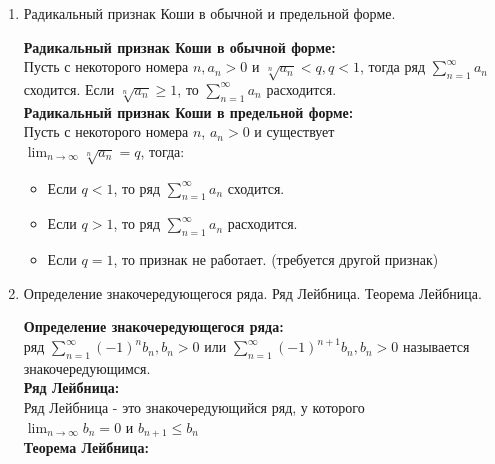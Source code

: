 \documentclass[a4paper, 12pt]{article}
\begin{document}
\begin{enumerate}
\begin{mdframed}
\begin{itemize}
			      \item Если $q < 1$, то ряд $\sum_{n=1}^{\infty} a_n$ сходится.
			      \item Если $q > 1$, то ряд $\sum_{n=1}^{\infty} a_n$ расходится.
			      \item Если $q = 1$, то признак не работает. (требуется другой признак)
		      \end{itemize}
	      \end{mdframed}
	\item Радикальный признак Коши в обычной и предельной форме. \\
	      \begin{mdframed}
		      \textbf{Радикальный признак Коши в обычной форме:} \\
		      Пусть с некоторого номера $n, a_n >  0$ и  $\sqrt[n]{a_n} < q, q < 1$, тогда ряд $\sum_{n=1}^{\infty} a_n$ сходится.
		      Если $\sqrt[n]{a_n} \ge 1$, то $\sum_{n=1}^{\infty} a_n$ расходится. \\
		      \textbf{Радикальный признак Коши в предельной форме:} \\
		      Пусть с некоторого номера $n$,  $a_n > 0$ и существует \\  $\lim_{n \to \infty} \sqrt[n]{a_n} = q$, тогда:
		      \begin{itemize}
			      \item Если $q < 1$, то ряд $\sum_{n=1}^{\infty} a_n$ сходится.
			      \item Если $q > 1$, то ряд $\sum_{n=1}^{\infty} a_n$ расходится.
			      \item Если $q = 1$, то признак не работает. (требуется другой признак)
		      \end{itemize}
	      \end{mdframed}
	\item Определение знакочередующегося ряда. Ряд Лейбница. Теорема Лейбница. \\
	      \begin{mdframed}
		      \textbf{Определение знакочередующегося ряда:} \\
		      ряд $\sum_{n=1}^{\infty} (-1)^{n}b_n, b_n > 0$ или $\sum_{n=1}^{\infty} (-1)^{n+1}b_n, b_n > 0$ называется знакочередующимся. \\
		      \textbf{Ряд Лейбница:} \\
		      Ряд Лейбница - это знакочередующийся ряд, у которого\\ $\lim_{n \to \infty} b_n = 0$ и $b_{n+1} \le b_n$ \\
		      \textbf{Теорема Лейбница:} \\

\end{mdframed}
\end{enumerate}
\end{document}
